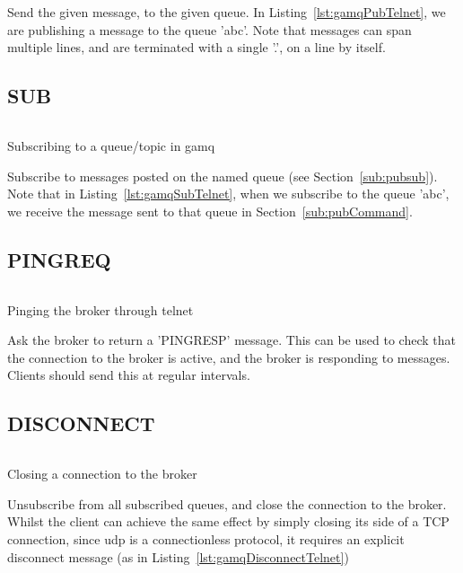 Send the given message, to the given queue. In Listing~\ref{lst:gamqPubTelnet},
we are publishing a message to the queue 'abc'. Note that messages can span
multiple lines, and are terminated with a single '.', on a line by itself.

\subsection{SUB}
\label{sub:subCommand}

\begin{listing}[H]
  \centering
  \inputminted{bash}{code/gamqSubOutput}
  \caption{Subscribing to a queue/topic in gamq}
  \label{lst:gamqSubTelnet}
\end{listing}

Subscribe to messages posted on the named queue (see Section~\ref{sub:pubsub}).
Note that in Listing~\ref{lst:gamqSubTelnet}, when we subscribe to the queue
'abc', we receive the message sent to that queue in
Section~\ref{sub:pubCommand}.

\subsection{PINGREQ}
\label{sub:pingreqCommand}

\begin{listing}[H]
  \centering
  \inputminted{bash}{code/gamqPingreqOutput}
  \caption{Pinging the broker through telnet}
  \label{lst:gamqPingreqTelnet}
\end{listing}

Ask the broker to return a 'PINGRESP' message. This can be used to check that
the connection to the broker is active, and the broker is responding to
messages. Clients should send this at regular intervals.

\subsection{DISCONNECT}
\label{sub:disconnectCommand}

\begin{listing}[H]
  \centering
  \inputminted{bash}{code/gamqDisconnectOutput}
  \caption{Closing a connection to the broker}
  \label{lst:gamqDisconnectTelnet}
\end{listing}

Unsubscribe from all subscribed queues, and close the connection to the broker.
Whilst the client can achieve the same effect by simply closing its side of a
TCP connection, since \gls{udp} is a connectionless protocol, it
requires an explicit disconnect message (as in
Listing~\ref{lst:gamqDisconnectTelnet})

